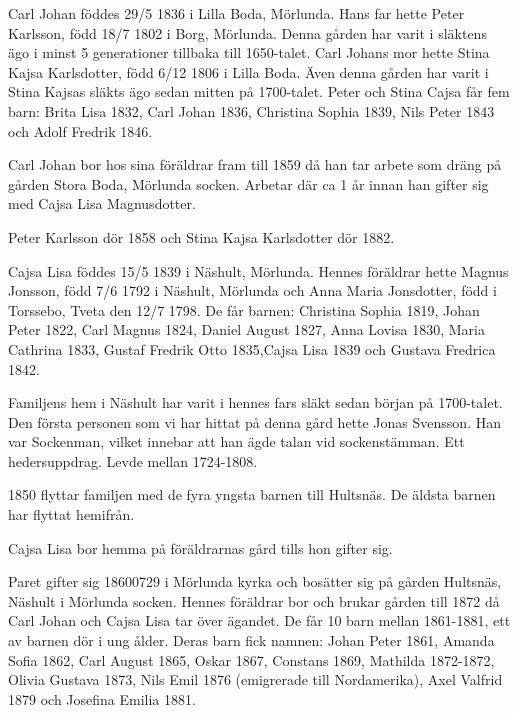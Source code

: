 








Carl Johan föddes 29/5 1836 i Lilla Boda, Mörlunda. 
Hans far hette Peter Karlsson, född 18/7 1802 i Borg, Mörlunda. 
Denna gården har varit i släktens ägo i minst 5 generationer tillbaka till 1650-talet. Carl Johans mor hette Stina Kajsa Karlsdotter, född 6/12 1806 i Lilla Boda. Även denna gården har varit i Stina Kajsas släkts ägo sedan mitten på 1700-talet.
Peter och Stina Cajsa får fem barn: Brita Lisa 1832, Carl Johan 1836, Christina Sophia 1839, Nils Peter 1843 och Adolf Fredrik 1846.

Carl Johan bor hos sina föräldrar fram till 1859 då han tar arbete som dräng på gården Stora Boda, Mörlunda socken. Arbetar där ca 1 år innan han gifter sig med Cajsa Lisa Magnusdotter.

Peter Karlsson dör 1858 och Stina Kajsa Karlsdotter dör 1882.



Cajsa Lisa föddes 15/5 1839 i Näshult, Mörlunda. Hennes föräldrar hette Magnus Jonsson, född 7/6 1792 i Näshult, Mörlunda och Anna Maria Jonsdotter, född i Torssebo, Tveta den 12/7 1798.
De får barnen: Christina Sophia 1819, Johan Peter 1822, Carl Magnus 1824, Daniel August 1827, Anna Lovisa 1830, Maria Cathrina 1833, Gustaf Fredrik Otto 1835,Cajsa Lisa 1839 och Gustava Fredrica 1842.
 
Familjens hem i Näshult har varit i hennes fars släkt sedan början på 1700-talet.
Den första personen som vi har hittat på denna gård hette Jonas Svensson. Han var Sockenman,  vilket innebar att han ägde talan vid sockenstämman. Ett hedersuppdrag.
Levde mellan 1724-1808.

1850 flyttar familjen med de fyra yngsta barnen till Hultsnäs. De äldsta barnen har flyttat hemifrån.

Cajsa Lisa bor hemma på föräldrarnas gård tills hon gifter sig.




Paret gifter sig 18600729 i Mörlunda kyrka och bosätter sig på gården Hultsnäs, Näshult i Mörlunda socken. Hennes föräldrar bor och brukar gården till 1872 då Carl Johan och Cajsa Lisa tar över ägandet.
De får 10 barn mellan 1861-1881, ett av barnen dör i ung ålder.
Deras barn fick namnen: Johan Peter 1861, Amanda Sofia 1862, Carl August 1865, Oskar 1867, Constans 1869, Mathilda 1872-1872, Olivia Gustava 1873, Nils Emil 1876 (emigrerade till Nordamerika), Axel Valfrid 1879 och Josefina Emilia 1881.



